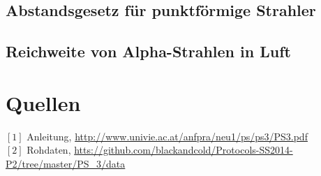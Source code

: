 \documentclass[12pt,a4paper]{article}
\begin{document}
\begin{multicols}{2}
\subsection{Abstandsgesetz für punktförmige Strahler}

\subsection{Reichweite von Alpha-Strahlen in Luft}



\section{Quellen}
$[1]$ Anleitung, \url{http://www.univie.ac.at/anfpra/neu1/ps/ps3/PS3.pdf}\\
$[2]$ Rohdaten, \url{htts://github.com/blackandcold/Protocols-SS2014-P2/tree/master/PS_3/data}\\

\end{multicols}
\end{document}
